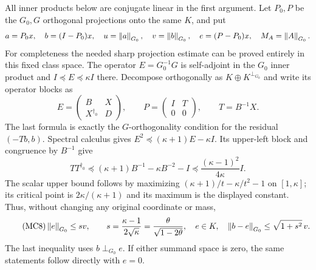 \documentclass[11pt]{article}
\begin{document}
All inner products below are conjugate linear in the first
argument. Let $P_0,P$ be the $G_0,G$ orthogonal projections
onto the same $K$, and put
\[
 a=P_0x,\quad b=(I-P_0)x,\quad
 u=\left\lVert a\right\rVert_{G_0},\quad v=\left\lVert b\right\rVert_{G_0},\quad
 e=(P-P_0)x,\quad M_A=\left\lVert A\right\rVert_{G_0}.
\]
For completeness the needed sharp projection estimate can be
proved entirely in this fixed class space. The operator
$E=G_0^{-1}G$ is self-adjoint in the $G_0$ inner product and
$I\preceq E\preceq\kappa I$ there. Decompose orthogonally as
$K\oplus K^{\perp_{G_0}}$ and write its operator blocks as
\[
 E=\begin{pmatrix}B&X\\X^{\dagger_0}&D\end{pmatrix},\qquad
 P=\begin{pmatrix}I&T\\0&0\end{pmatrix},\qquad T=B^{-1}X.
\]
The last formula is exactly the $G$-orthogonality condition for
the residual $(-Tb,b)$. Spectral calculus gives
$E^2\preceq(\kappa+1)E-\kappa I$. Its upper-left block and
congruence by $B^{-1}$ give
\[
 TT^{\dagger_0}\preceq(\kappa+1)B^{-1}-\kappa B^{-2}-I
 \preceq\frac{(\kappa-1)^2}{4\kappa}I.
\]
The scalar upper bound follows by maximizing
$(\kappa+1)/t-\kappa/t^2-1$ on $[1,\kappa]$; its critical
point is $2\kappa/(\kappa+1)$ and its maximum is the displayed
constant. Thus, without changing any original coordinate or mass,
\begin{equation}\tag{MC8}\label{mcind:eq:projection}
 \left\lVert e\right\rVert_{G_0}\le sv,\qquad
 s=\frac{\kappa-1}{2\sqrt\kappa}
   =\frac{\theta}{\sqrt{1-2\theta}},\quad e\in K,
 \quad\left\lVert b-e\right\rVert_{G_0}\le\sqrt{1+s^2}\,v.
\end{equation}
The last inequality uses $b\perp_{G_0}e$. If either summand
space is zero, the same statements follow directly with $e=0$.
\end{document}
